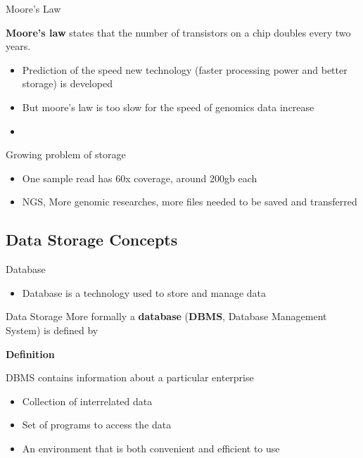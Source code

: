 \documentclass{beamer}
\begin{document}
\begin{frame}{Moore's Law}
  \begin{block}{\textbf{Moore's law}} 
    states that the number of transistors on a chip doubles every two years.\cite{kurose}
  \end{block}
  \begin{itemize}   
    \item Prediction of the speed new technology (faster processing power and better storage) is developed
    \item But moore's law is too slow for the speed of genomics data increase
    \item
  \end{itemize}
\end{frame}

\begin{frame}{Growing problem of storage}
  \begin{itemize}   
    \item One sample read\cite{seqtorr} has 60x coverage, around 200gb each
    \item NGS, More genomic researches, more files needed to be saved and transferred
  \end{itemize}
\end{frame}

\subsection{Data Storage Concepts}
\begin{frame}{Database}
  \begin{itemize}   
    \item Database is a technology used to store and manage data
  \end{itemize}
\end{frame}
  \begin{frame}{Data Storage}
        More formally a \textbf{database} (\textbf{DBMS}, Database Management System) is defined by 
        \begin{block} {\textbf{Definition}}

        DBMS contains information about a particular enterprise
        \begin{itemize}
            \item Collection of interrelated data
            \item Set of programs to access the data 
            \item An environment that is both convenient and efficient to use
        \end{itemize}
        \cite{Silberschatz2010}
        \end{block}
    \end{frame}
    
\end{document}
